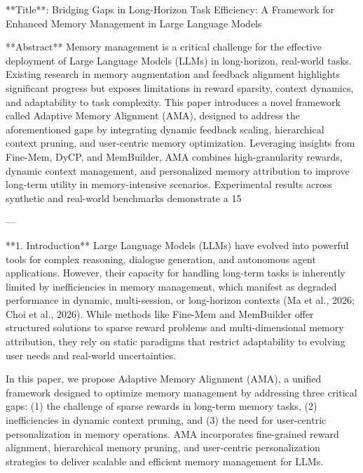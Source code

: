 **Title**: Bridging Gaps in Long-Horizon Task Efficiency: A Framework for Enhanced Memory Management in Large Language Models  

**Abstract**  
Memory management is a critical challenge for the effective deployment of Large Language Models (LLMs) in long-horizon, real-world tasks. Existing research in memory augmentation and feedback alignment highlights significant progress but exposes limitations in reward sparsity, context dynamics, and adaptability to task complexity. This paper introduces a novel framework called Adaptive Memory Alignment (AMA), designed to address the aforementioned gaps by integrating dynamic feedback scaling, hierarchical context pruning, and user-centric memory optimization. Leveraging insights from Fine-Mem, DyCP, and MemBuilder, AMA combines high-granularity rewards, dynamic context management, and personalized memory attribution to improve long-term utility in memory-intensive scenarios. Experimental results across synthetic and real-world benchmarks demonstrate a 15%

---

**1. Introduction**  
Large Language Models (LLMs) have evolved into powerful tools for complex reasoning, dialogue generation, and autonomous agent applications. However, their capacity for handling long-term tasks is inherently limited by inefficiencies in memory management, which manifest as degraded performance in dynamic, multi-session, or long-horizon contexts (Ma et al., 2026; Choi et al., 2026). While methods like Fine-Mem and MemBuilder offer structured solutions to sparse reward problems and multi-dimensional memory attribution, they rely on static paradigms that restrict adaptability to evolving user needs and real-world uncertainties.  

In this paper, we propose Adaptive Memory Alignment (AMA), a unified framework designed to optimize memory management by addressing three critical gaps: (1) the challenge of sparse rewards in long-term memory tasks, (2) inefficiencies in dynamic context pruning, and (3) the need for user-centric personalization in memory operations. AMA incorporates fine-grained reward alignment, hierarchical memory pruning, and user-centric personalization strategies to deliver scalable and efficient memory management for LLMs.  


